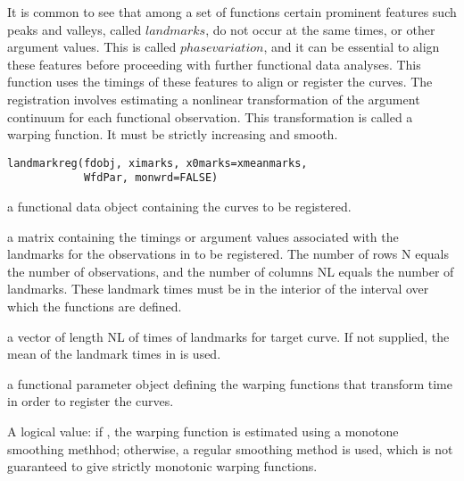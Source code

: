 \begin{Description}\relax
It is common to see that among a set of functions certain prominent
features such peaks and valleys, called $landmarks$, do not occur
at the same times, or other
argument values.  This is called $phase variation$, and it can be
essential to align these features before proceeding with further
functional data analyses.  This function uses the timings of these
features to align or register the curves.  The registration involves
estimating a nonlinear transformation of the argument continuum for each
functional observation.  This transformation is called a warping
function. It must be strictly increasing and smooth.
\end{Description}
\begin{Usage}
\begin{verbatim}
landmarkreg(fdobj, ximarks, x0marks=xmeanmarks,
            WfdPar, monwrd=FALSE)
\end{verbatim}
\end{Usage}
\begin{Arguments}
\begin{ldescription}
\item[\code{fdobj}] a functional data object containing the curves to be registered.

\item[\code{ximarks}] a matrix containing the timings or argument values associated with
the landmarks for the observations in  to be registered.
The number of rows N equals the number of observations, and the
number of columns NL equals the number of landmarks. These landmark
times must be in the interior of the interval over which the
functions are defined.

\item[\code{x0marks}] a vector of length NL of times of landmarks for target curve.  If
not supplied, the mean of the landmark times in  is
used.

\item[\code{WfdPar}] a functional parameter object defining the warping functions that
transform time in order to register the curves.

\item[\code{monwrd}] A logical value:  if , the warping function is estimated
using a monotone smoothing methhod; otherwise, a regular smoothing
method is used, which is not guaranteed to give strictly monotonic
warping functions.

\end{ldescription}
\end{Arguments}

